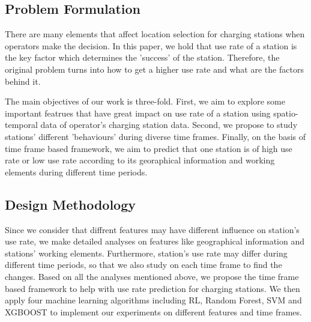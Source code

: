 \subsection{Problem Formulation}
There are many elements that affect location selection for charging stations when operators make the decision. In this paper, we hold that use rate of a station is the key factor which determines the 'success' of the station. Therefore, the original problem turns into how to get a higher use rate and what are the factors behind it. 

The main objectives of our work is three-fold. First, we aim to explore some important featrues that have great impact on use rate of a station using spatio-temporal data of operator's charging station data. Second, we propose to study stations' different 'behaviours' during diverse time frames. Finally, on the basis of time frame based framework, we aim to predict that one station is of high use rate or low use rate according to its georaphical information and working elements during different time periods.

\subsection{Design Methodology}
Since we consider that diffrent features may have different influence on station's use rate, we make detailed analyses on features like geographical information and stations' working elements. Furthermore, station's use rate may differ during different time periods, so that we also study on each time frame to find the changes. Based on all the analyses mentioned above, we propose the time frame based framework to help with use rate prediction for charging stations. We then apply four machine learning algorithms including RL, Random Forest, SVM and XGBOOST to implement our experiments on different features and time frames.